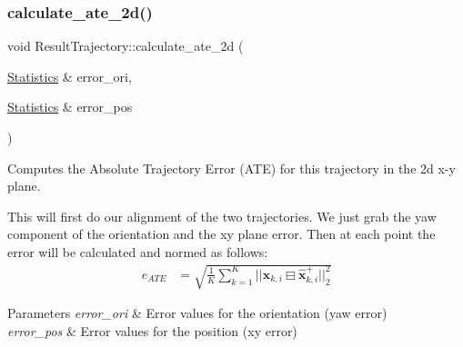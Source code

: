 \subsubsection{\texorpdfstring{calculate\+\_\+ate\+\_\+2d()}{calculate\_ate\_2d()}}
{\footnotesize\ttfamily void Result\+Trajectory\+::calculate\+\_\+ate\+\_\+2d (\begin{DoxyParamCaption}\item[{\hyperlink{structov__eval_1_1Statistics}{Statistics} \&}]{error\+\_\+ori,  }\item[{\hyperlink{structov__eval_1_1Statistics}{Statistics} \&}]{error\+\_\+pos }\end{DoxyParamCaption})}



Computes the Absolute Trajectory Error (A\+TE) for this trajectory in the 2d x-\/y plane. 

This will first do our alignment of the two trajectories. We just grab the yaw component of the orientation and the xy plane error. Then at each point the error will be calculated and normed as follows\+: \begin{align*} e_{ATE} &= \sqrt{ \frac{1}{K} \sum_{k=1}^{K} ||\mathbf{x}_{k,i} \boxminus \hat{\mathbf{x}}^+_{k,i}||^2_{2} } \end{align*}


\begin{DoxyParams}{Parameters}
{\em error\+\_\+ori} & Error values for the orientation (yaw error) \\
\hline
{\em error\+\_\+pos} & Error values for the position (xy error) \\
\hline
\end{DoxyParams}
\mbox{\label{classov__eval_1_1ResultTrajectory_a8c8675c3a9ebc8415e41c38175691e46}} 

